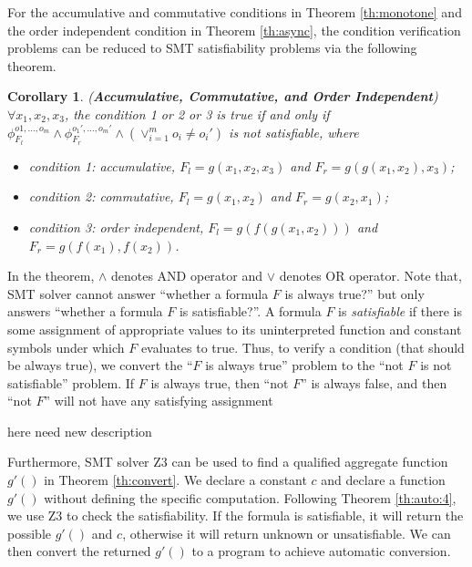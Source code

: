 For the accumulative and commutative conditions in Theorem \ref{th:monotone} and the order independent condition in Theorem \ref{th:async}, the condition verification problems can be reduced to SMT satisfiability problems via the following theorem.

\newtheorem{corollary}{Corollary}
\begin{corollary}
	\label{coro:auto:1}
	(\textbf{Accumulative, Commutative, and Order Independent}) $\forall x_1,x_2,x_3$, the condition 1 or 2 or 3 is true if and only if $\phi_{F_l}^{o1,\ldots,o_m}\wedge \phi_{F_r}^{o_1',\ldots,o_m'}\wedge (\vee_{i=1}^m{o_i\neq o_i'})$ is not satisfiable, where
	\begin{itemize}
		\item condition 1: accumulative, $F_l=g(x_1,x_2,x_3)$ and $F_r=g(g(x_1,x_2),x_3)$;
		\item condition 2: commutative, $F_l=g(x_1,x_2)$ and $F_r=g(x_2,x_1)$;
		\item condition 3: order independent, $F_l=g(f(g(x_1,x_2)))$ and $F_r=g(f(x_1),f(x_2))$.
	\end{itemize}
\end{corollary}

In the theorem, $\wedge$ denotes AND operator and $\vee$ denotes OR operator. Note that, SMT solver cannot answer ``whether a formula $F$ is always true?'' but only answers ``whether a formula $F$ is satisfiable?''. A formula $F$ is \emph{satisfiable} if there is some assignment of appropriate values to its uninterpreted function and constant symbols under which $F$ evaluates to true. Thus, to verify a condition (that should be always true), we convert the ``$F$ is always true'' problem to the ``not $F$ is not satisfiable'' problem. If $F$ is always true, then ``not $F$'' is always false, and then ``not $F$'' will not have any satisfying assignment

here need new description


Furthermore, SMT solver Z3 can be used to find a qualified aggregate function $g'()$ in Theorem \ref{th:convert}. We declare a constant $c$ and declare a function $g'()$ without defining the specific computation. Following Theorem \ref{th:auto:4}, we use Z3 to check the satisfiability. If the formula is satisfiable, it will return the possible $g'()$ and $c$, otherwise it will return unknown or unsatisfiable. We can then convert the returned $g'()$ to a program to achieve automatic conversion.
